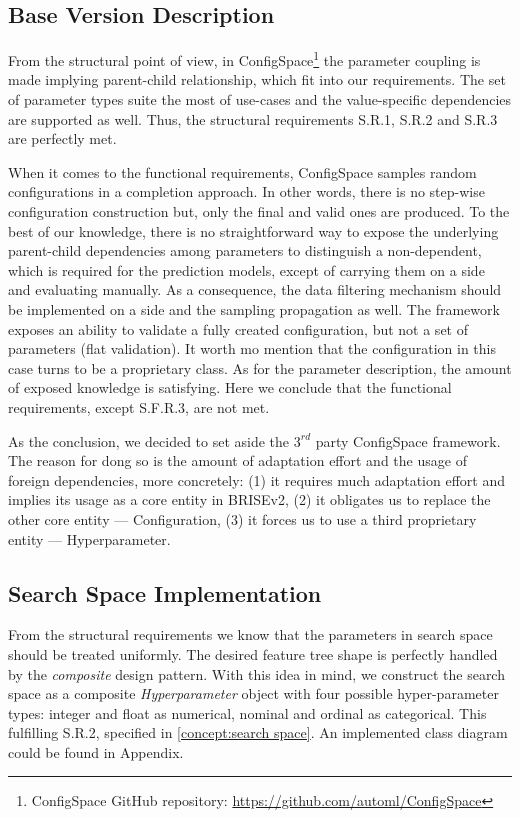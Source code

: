 \subsection{Base Version Description}
From the structural point of view, in ConfigSpace\footnote{ConfigSpace GitHub repository: \url{https://github.com/automl/ConfigSpace}} the parameter coupling is made implying parent-child relationship, which fit into our requirements. The set of parameter types suite the most of use-cases and the value-specific dependencies are supported as well. Thus, the structural requirements S.R.1, S.R.2 and S.R.3 are perfectly met.

When it comes to the functional requirements, ConfigSpace samples random configurations in a completion approach. In other words, there is no step-wise configuration construction but, only the final and valid ones are produced. To the best of our knowledge, there is no straightforward way to expose the underlying parent-child dependencies among parameters to distinguish a non-dependent, which is required for the prediction models, except of carrying them on a side and evaluating manually. As a consequence, the data filtering mechanism should be implemented on a side and the sampling propagation as well. The framework exposes an ability to validate a fully created configuration, but not a set of parameters (flat validation). It worth mo mention that the configuration in this case turns to be a proprietary class. As for the parameter description, the amount of exposed knowledge is satisfying. Here we conclude that the functional requirements, except S.F.R.3, are not met.

As the conclusion, we decided to set aside the $3^{rd}$ party ConfigSpace framework. The reason for dong so is the amount of adaptation effort and the usage of foreign dependencies, more concretely: (1) it requires much adaptation effort and implies its usage as a core entity in BRISEv2, (2) it obligates us to replace the other core entity — Configuration, (3) it forces us to use a third proprietary entity — Hyperparameter. 

\subsection{Search Space Implementation}\label{impl: search space impl}
From the structural requirements we know that the parameters in search space should be treated uniformly. The desired feature tree shape is perfectly handled by the \emph{composite} design pattern. With this idea in mind, we construct the search space as a composite \emph{Hyperparameter} object with four possible hyper-parameter types: integer and float as numerical, nominal and ordinal as categorical. This fulfilling S.R.2, specified in \cref{concept:search space}. An implemented class diagram could be found in Appendix.

